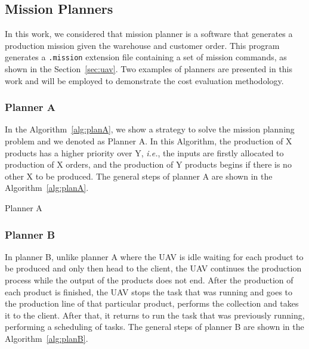\documentclass[conference,harvard,brazil,english]{sbatex}
\begin{document}
\subsection{Mission Planners}

In this work, we considered that mission planner is a software that generates a production mission given the warehouse and customer order. This program generates a \texttt{.mission} extension file containing a set of mission commands, as shown in the Section~\ref{sec:uav}. Two examples of planners are presented in this work and will be employed to demonstrate the cost evaluation methodology.

\subsubsection{Planner A}

In the Algorithm~\ref{alg:planA}, we show a strategy to solve the mission planning problem and we denoted as Planner A. In this Algorithm, the production of X products has a higher priority over Y, {\it i.e.}, the inputs are firstly allocated to production of X orders, and the production of Y products begins if there is no other X to be produced. The general steps of planner A are shown in the Algorithm~\ref{alg:planA}.

\begin{algorithm}[ht]
\footnotesize
{}
\captionsetup{list=no}
\caption{Planner A}\label{alg:planA}
\end{algorithm}

\subsubsection{Planner B}
In planner B, unlike planner A where the UAV is idle waiting for each product to be produced and only then head to the client, the UAV continues the production process while the output of the products does not end. After the production of each product is finished, the UAV stops the task that was running and goes to the production line of that particular product, performs the collection and takes it to the client. After that, it returns to run the task that was previously running, performing a scheduling of tasks. The general steps of planner B are shown in the Algorithm~\ref{alg:planB}.
\end{document}
